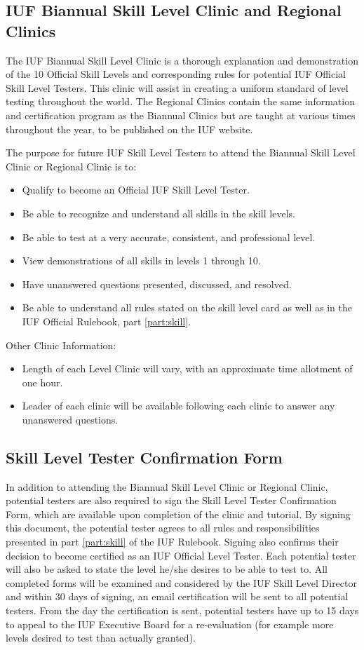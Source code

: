 \subsection{IUF Biannual Skill Level Clinic and Regional Clinics}
The IUF Biannual Skill Level Clinic is a thorough explanation and demonstration of the 10 Official Skill Levels and corresponding rules for potential IUF Official Skill Level Testers.
This clinic will assist in creating a uniform standard of level testing throughout the world.
The Regional Clinics contain the same information and certification program as the Biannual Clinics but are taught at various times throughout the year, to be published on the IUF website.

The purpose for future IUF Skill Level Testers to attend the Biannual Skill Level Clinic or Regional Clinic is to:
\begin{itemize}
\item Qualify to become an Official IUF Skill Level Tester.
\item Be able to recognize and understand all skills in the skill levels.
\item Be able to test at a very accurate, consistent, and professional level.
\item View demonstrations of all skills in levels 1 through 10.
\item Have unanswered questions presented, discussed, and resolved.
\item Be able to understand all rules stated on the skill level card as well as in the IUF Official Rulebook, part \ref{part:skill}.
\end{itemize}
Other Clinic Information:
\begin{itemize}
\item Length of each Level Clinic will vary, with an approximate time allotment of one hour.
\item Leader of each clinic will be available following each clinic to answer any unanswered questions.
\end{itemize}

\subsection{Skill Level Tester Confirmation Form}
In addition to attending the Biannual Skill Level Clinic or Regional Clinic, potential testers are also required to sign the Skill Level Tester Confirmation Form, which are available upon completion of the clinic and tutorial.
By signing this document, the potential tester agrees to all rules and responsibilities presented in part \ref{part:skill} of the IUF Rulebook.
Signing also confirms their decision to become certified as an IUF Official Level Tester.
Each potential tester will also be asked to state the level he/she desires to be able to test to.
All completed forms will be examined and considered by the IUF Skill Level Director and within 30 days of signing, an email certification will be sent to all potential testers.
From the day the certification is sent, potential testers have up to 15 days to appeal to the IUF Executive Board for a re-evaluation (for example more levels desired to test than actually granted).

